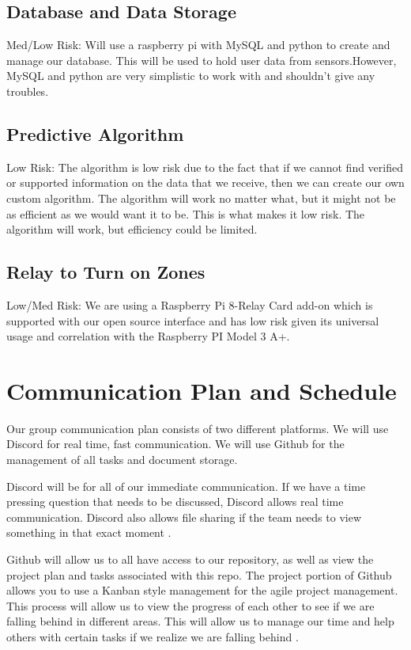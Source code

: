 \documentclass[letterpaper, 10 pt, conference]{ieeeconf}  %
\begin{document}
\subsection{Database and Data Storage}
Med/Low Risk: Will use a raspberry pi with MySQL and python to create and manage our database. This will be used to hold user data from sensors.However, MySQL and python are very simplistic to work with and shouldn't give any troubles.

\subsection{Predictive Algorithm}
Low Risk: The algorithm is low risk due to the fact that if we cannot find verified or supported information on the data that we receive, then we can create our own custom algorithm. The algorithm will work no matter what, but it might not be as efficient as we would want it to be. This is what makes it low risk. The algorithm will work, but efficiency could be limited.

\subsection{Relay to Turn on Zones}
Low/Med Risk: We are using a Raspberry Pi 8-Relay Card add-on which is supported with our open source interface and has low risk given its universal usage and correlation with the Raspberry PI Model 3 A+.

\section{Communication Plan and Schedule}
Our group communication plan consists of two different platforms. We will use Discord for real time, fast communication. We will use Github for the management of all tasks and document storage. 

Discord will be for all of our immediate communication. If we have a time pressing question that needs to be discussed, Discord allows real time communication. Discord also allows file sharing if the team needs to view something in that exact moment \cite{discord}.

Github will allow us to all have access to our repository, as well as view the project plan and tasks associated with this repo. The project portion of Github allows you to use a Kanban style management for the agile project management. This process will allow us to view the progress of each other to see if we are falling behind in different areas. This will allow us to manage our time and help others with certain tasks if we realize we are falling behind \cite{github}. 
\end{document}
